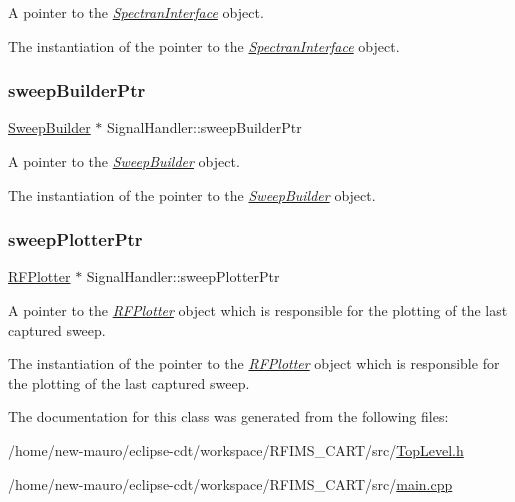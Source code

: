 A pointer to the {\itshape \hyperlink{classSpectranInterface}{Spectran\+Interface}} object. 

The instantiation of the pointer to the {\itshape \hyperlink{classSpectranInterface}{Spectran\+Interface}} object. \mbox{\label{classSignalHandler_a23ec28699521fb435a5eb90f2c36bccb}} 
\subsubsection{\texorpdfstring{sweep\+Builder\+Ptr}{sweepBuilderPtr}}
{\footnotesize\ttfamily \hyperlink{classSweepBuilder}{Sweep\+Builder} $\ast$ Signal\+Handler\+::sweep\+Builder\+Ptr\hspace{0.3cm}{\ttfamily [static]}}



A pointer to the {\itshape \hyperlink{classSweepBuilder}{Sweep\+Builder}} object. 

The instantiation of the pointer to the {\itshape \hyperlink{classSweepBuilder}{Sweep\+Builder}} object. \mbox{\label{classSignalHandler_a7ec978dc8c16c31aa8faefe4e350302c}} 
\subsubsection{\texorpdfstring{sweep\+Plotter\+Ptr}{sweepPlotterPtr}}
{\footnotesize\ttfamily \hyperlink{classRFPlotter}{R\+F\+Plotter} $\ast$ Signal\+Handler\+::sweep\+Plotter\+Ptr\hspace{0.3cm}{\ttfamily [static]}}



A pointer to the {\itshape \hyperlink{classRFPlotter}{R\+F\+Plotter}} object which is responsible for the plotting of the last captured sweep. 

The instantiation of the pointer to the {\itshape \hyperlink{classRFPlotter}{R\+F\+Plotter}} object which is responsible for the plotting of the last captured sweep. 

The documentation for this class was generated from the following files\+:\begin{DoxyCompactItemize}
\item 
/home/new-\/mauro/eclipse-\/cdt/workspace/\+R\+F\+I\+M\+S\+\_\+\+C\+A\+R\+T/src/\hyperlink{TopLevel_8h}{Top\+Level.\+h}\item 
/home/new-\/mauro/eclipse-\/cdt/workspace/\+R\+F\+I\+M\+S\+\_\+\+C\+A\+R\+T/src/\hyperlink{main_8cpp}{main.\+cpp}\end{DoxyCompactItemize}
